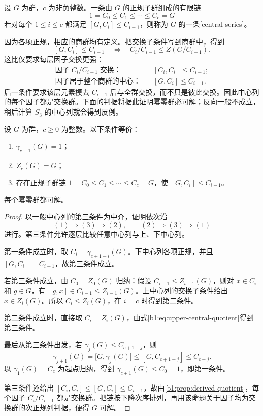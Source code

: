 \begin{definition}[中心列]\label{b1:def:general-central-series}
	设 \(G\) 为群，\(c\) 为非负整数。一条由 \(G\) 的正规子群组成的有限链
	\[
		1=C_0\le C_1\le\cdots\le C_c=G
	\]
	若对每个 \(1\le i\le c\) 都满足 \([G,C_i]\le C_{i-1}\)，则称为 \(G\) 的一条[central series]。
\end{definition}

因为各项正规，相应的商群均有定义。把交换子条件写到商群中，得到
\[
	[G,C_i]\le C_{i-1} \quad\Longleftrightarrow\quad C_i/C_{i-1}\le Z(G/C_{i-1}).
\]
这比仅要求每层因子交换更强：
\[
	\begin{aligned}
		\text{因子}\;C_i/C_{i-1}\;\text{交换：}&\quad [C_i,C_i]\le C_{i-1};\\
		\text{因子居于整个商群的中心：}&\quad [G,C_i]\le C_{i-1}.
	\end{aligned}
\]
后一条件要求该层元素模去 \(C_{i-1}\) 后与全群交换，而不只是彼此交换。因此中心列的每个因子都是交换群。下面的判据将据此证明幂零群必可解；反向一般不成立，稍后计算 \(S_3\) 的中心列就会得到反例。

\begin{samepage}
	\begin{proposition}[中心列的等价判据]\label{b1:prop:central-series-equivalence}
		设 \(G\) 为群，\(c\ge0\) 为整数。以下条件等价：
		\begin{enumerate}
			\item \(\gamma_{c+1}(G)=1\)；
			\item \(Z_c(G)=G\)；
			\item 存在正规子群链 \(1=C_0\le C_1\le\cdots\le C_c=G\)，使 \([G,C_i]\le C_{i-1}\)。
		\end{enumerate}
		每个幂零群都可解。
	\end{proposition}
\end{samepage}
\begin{proof}
	以一般中心列的第三条件为中介，证明依次沿
	\[
		(1)\Longrightarrow(3)\Longrightarrow(2), \qquad (2)\Longrightarrow(3)\Longrightarrow(1)
	\]
	进行。第三条件允许逐层比较任意中心列与上、下中心列。

	第一条件成立时，取 \(C_i=\gamma_{c+1-i}(G)\)。下中心列各项正规，并且 \([G,C_i]=C_{i-1}\)，故第三条件成立。

	若第三条件成立，由 \(C_0=Z_0(G)\) 归纳：假设 \(C_{i-1}\le Z_{i-1}(G)\)，则对 \(x\in C_i\) 和 \(g\in G\)，有 \([g,x]\in C_{i-1}\le Z_{i-1}(G)\)。上中心列的交换子条件给出 \(x\in Z_i(G)\)。所以 \(C_i\le Z_i(G)\)，在 \(i=c\) 时得到第二条件。

	第二条件成立时，直接取 \(C_i=Z_i(G)\)，由式\eqref{b1:eq:upper-central-quotient}得到第三条件。

	最后从第三条件出发，若 \(\gamma_j(G)\le C_{c+1-j}\)，则
	\[
		\gamma_{j+1}(G)=\bigl[G,\gamma_j(G)\bigr] \le [G,C_{c+1-j}]\le C_{c-j}.
	\]
	以 \(\gamma_1(G)=C_c\) 为起点归纳，得到 \(\gamma_{c+1}(G)\le C_0=1\)，即第一条件。

	第三条件还给出 \([C_i,C_i]\le[G,C_i]\le C_{i-1}\)，故由\cref{b1:prop:derived-quotient}，每个因子 \(C_i/C_{i-1}\) 都是交换群。把链按下降次序排列，再用该命题关于因子均为交换群的次正规列判据，便得 \(G\) 可解。
\end{proof}

